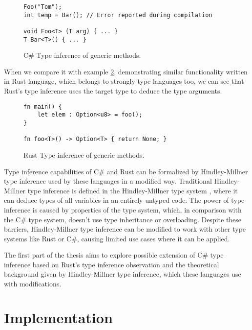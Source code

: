 \par
\begin{figure}
\begin{lstlisting}
Foo("Tom");
int temp = Bar(); // Error reported during compilation

void Foo<T> (T arg) { ... }
T Bar<T>() { ... }
\end{lstlisting}
\caption{C\# Type inference of generic methods.}
\label{img02:csharp_infer_meth}
\end{figure}
\par
When we compare it with example \ref{img03:rust_infer_meth}, demonstrating similar functionality written in Rust language, which belongs to strongly type languages too, we can see that Rust's type inference uses the target type to deduce the type arguments.
\par
\begin{figure}
\begin{lstlisting}
fn main() {
    let elem : Option<u8> = foo(); 
}

fn foo<T>() -> Option<T> { return None; }
\end{lstlisting}
\caption{Rust Type inference of generic methods.}
\label{img03:rust_infer_meth}
\end{figure}
\par
{}
Type inference capabilities of C\# and Rust can be formalized by Hindley-Millner type inference \cite{online:yHM} used by these languages in a modified way. 
Traditional Hindley-Millner type inference is defined in the Hindley-Millner type system \cite{online:wikiHM}, where it can deduce types of all variables in an entirely untyped code. 
The power of type inference is caused by properties of the type system, which, in comparison with the C\# type system, doesn't use type inheritance or overloading. 
Despite these barriers, Hindley-Millner type inference can be modified to work with other type systems like Rust or C\#, causing limited use cases where it can be applied.
\par
{}
The first part of the thesis aims to explore possible extension of C\# type inference based on Rust's type inference observation and the theoretical background given by Hindley-Millner type inference, which these languages use with modifications.

\section{Implementation}

